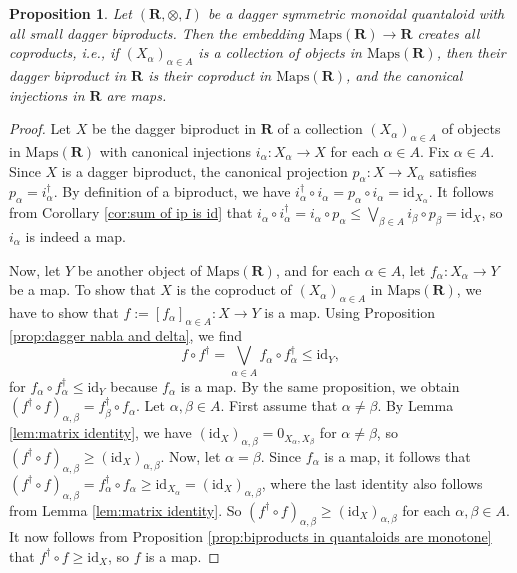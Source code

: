 \documentclass[12pt]{tac}
\newtheorem{proposition}[theorem]{Proposition}
\theoremstyle{definition}
\theoremstyle{remark}
\newcommand{\<}{\langle}
\renewcommand{\>}{\rangle}
\renewcommand{\:}{\colon}
\newcommand{\id}{\mathrm{id}}
\begin{document}
\begin{proposition}\label{prop:coproducts of Maps}
    Let $(\mathbf R,\otimes,I)$ be a dagger symmetric monoidal quantaloid with all small dagger biproducts. Then the embedding $\mathrm{Maps}(\mathbf R)\to\mathbf R$ creates all coproducts, i.e., if $(X_\alpha)_{\alpha\in A}$ is a collection of objects in $\mathrm {Maps}(\mathbf R)$, then their dagger biproduct in $\mathbf R$ is their coproduct in $\mathrm{Maps}(\mathbf R)$, and the canonical injections in $\mathbf R$ are maps.
\end{proposition}
\begin{proof}
Let $X$ be the dagger biproduct in $\mathbf R$ of a collection $(X_\alpha)_{\alpha\in A}$ of objects in $\mathrm{Maps}(\mathbf R)$ with canonical injections $i_\alpha:X_\alpha\to X$ for each $\alpha\in A$. Fix $\alpha\in A$. Since $X$ is a dagger biproduct, the canonical projection $p_\alpha:X\to X_\alpha$ satisfies $p_\alpha= i_\alpha^\dag$. By definition of a biproduct, we have $i_\alpha^\dag\circ i_\alpha=p_\alpha\circ i_\alpha=\id_{X_\alpha}.$ It follows from Corollary \ref{cor:sum of ip is id} that $i_\alpha\circ i_\alpha^\dag=i_\alpha\circ p_\alpha\leq\bigvee_{\beta\in A}i_\beta\circ p_\beta=\id_X$,  so $i_\alpha$ is indeed a map.

Now, let $Y$ be another object of $\mathrm{Maps}(\mathbf R)$, and for each $\alpha\in A$, let $f_\alpha:X_\alpha\to Y$ be a map. To show that $X$ is the coproduct of $(X_\alpha)_{\alpha\in A}$ in $\mathrm{Maps}(\mathbf R)$, we have to show that  $f:=[f_\alpha]_{\alpha\in A}:X\to Y$ is a map. Using Proposition \ref{prop:dagger nabla and delta}, we find
\[ f\circ f^\dag=\bigvee_{\alpha\in A}f_\alpha\circ f_\alpha^\dag\leq\id_Y,\]
for $f_\alpha\circ f_\alpha^\dag\leq \id_Y$ because $f_\alpha$ is a map. By the same proposition, we obtain $(f^\dag\circ f)_{\alpha,\beta}=f_\beta^\dag\circ f_\alpha$.
Let $\alpha,\beta\in A$. First assume that $\alpha\neq\beta$. By Lemma \ref{lem:matrix identity}, we have $(\id_X)_{\alpha,\beta}=0_{X_\alpha,X_\beta}$ for $\alpha\neq\beta$, so $(f^\dag\circ f)_{\alpha,\beta}\geq (\id_{X})_{\alpha,\beta}$. Now, let $\alpha=\beta$. Since $f_\alpha$ is a map, it follows that $(f^\dag\circ f)_{\alpha,\beta}=f_\alpha^\dag\circ f_\alpha\geq\id_{X_\alpha}=(\id_X)_{\alpha,\beta}$, where the last identity also follows from Lemma \ref{lem:matrix identity}. So $(f^\dag\circ f)_{\alpha,\beta}\geq(\id_X)_{\alpha,\beta}$ for each $\alpha,\beta\in A$. It now follows from Proposition \ref{prop:biproducts in quantaloids are monotone} that $f^\dag\circ f\geq\id_X$, so $f$ is a map.\end{proof}
\end{document}
